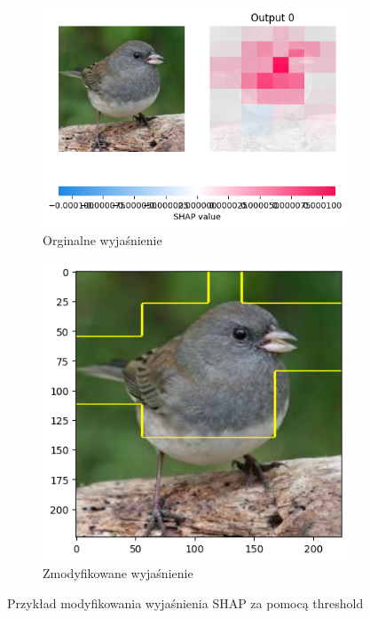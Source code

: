 \begin{figure}[h]
	\centering
	\begin{subfigure}[b]{0.45\textwidth}
		\includegraphics[width=.9\textwidth]{img/parameters/shap/threshold_base}
		\caption{Orginalne wyjaśnienie}  \label{rys:parameters_lime_numsamples_5}
	\end{subfigure}
	\begin{subfigure}[b]{0.45\textwidth}
		\centering\includegraphics[width=.9\textwidth]{img/parameters/shap/threshold_mean}
		\caption{Zmodyfikowane wyjaśnienie}  \label{rys:parameters_lime_numsamples_1000}
	\end{subfigure}
	\caption{Przykład modyfikowania wyjaśnienia SHAP za pomocą threshold}
\end{figure}

